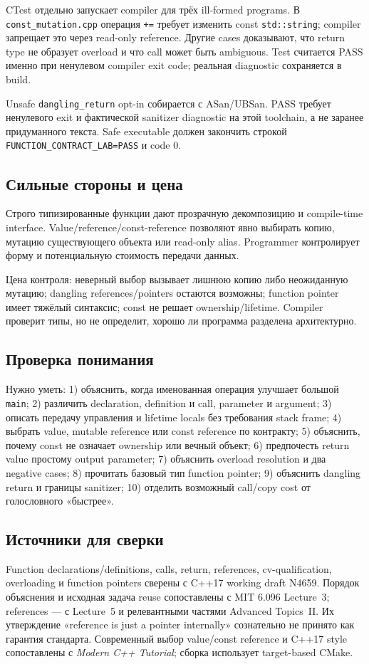 CTest отдельно запускает compiler для трёх ill-formed programs. В
\texttt{const\_mutation.cpp} операция \texttt{+=} требует изменить const
\texttt{std::string}; compiler запрещает это через read-only reference.
Другие cases доказывают, что return type не образует overload и что call может
быть ambiguous. Test считается PASS именно при ненулевом compiler exit code;
реальная diagnostic сохраняется в build.

Unsafe \texttt{dangling\_return} opt-in собирается с ASan/UBSan. PASS требует
ненулевого exit и фактической sanitizer diagnostic на этой toolchain, а не
заранее придуманного текста. Safe executable должен закончить строкой
\texttt{FUNCTION\_CONTRACT\_LAB=PASS} и code 0.

\subsection{Сильные стороны и цена}

Строго типизированные функции дают прозрачную декомпозицию и compile-time
interface. Value/reference/const-reference позволяют явно выбирать копию,
мутацию существующего объекта или read-only alias. Programmer контролирует
форму и потенциальную стоимость передачи данных.

Цена контроля: неверный выбор вызывает лишнюю копию либо неожиданную
мутацию; dangling references/pointers остаются возможны; function pointer
имеет тяжёлый синтаксис; const не решает ownership/lifetime. Compiler проверит
типы, но не определит, хорошо ли программа разделена архитектурно.

\subsection{Проверка понимания}

Нужно уметь:
1) объяснить, когда именованная операция улучшает большой \texttt{main}; 2) различить declaration, definition и call, parameter и argument; 3) описать передачу управления и lifetime locals без требования stack frame; 4) выбрать value, mutable reference или const reference по контракту; 5) объяснить, почему const не означает ownership или вечный объект; 6) предпочесть return value простому output parameter; 7) объяснить overload resolution и два negative cases; 8) прочитать базовый тип function pointer; 9) объяснить dangling return и границы sanitizer; 10) отделить возможный call/copy cost от голословного «быстрее».

\subsection{Источники для сверки}

Function declarations/definitions, calls, return, references,
cv-qualification, overloading и function pointers сверены с C++17 working
draft N4659. Порядок объяснения и исходная задача reuse сопоставлены с MIT
6.096 Lecture~3; references --- с Lecture~5 и релевантными частями Advanced
Topics~II. Их утверждение «reference is just a pointer internally» сознательно
не принято как гарантия стандарта. Современный выбор value/const reference и
C++17 style сопоставлены с \textit{Modern C++ Tutorial}; сборка использует
target-based CMake.
